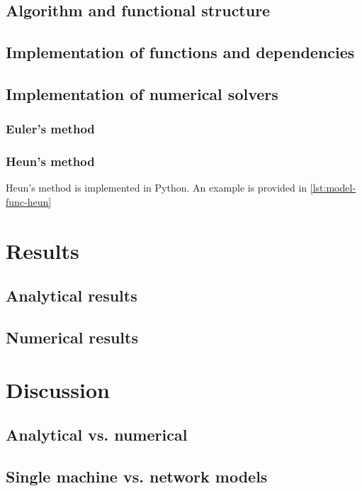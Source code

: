 \section{Algorithm and functional structure}

\section{Implementation of functions and dependencies}

\section{Implementation of numerical solvers}

\subsection*{Euler's method}

\subsection*{Heun's method}
Heun's method is implemented in Python. An example is provided in \autoref{lst:model-func-heun}

\chapter{Results}
\label{chap:results}

\section{Analytical results}

\section{Numerical results}

\chapter{Discussion}
\label{chap:discussion}

\section{Analytical vs. numerical}

\section{Single machine vs. network models}